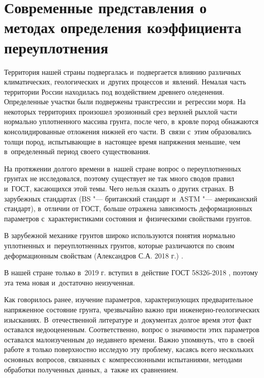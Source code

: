 \chapter{Современные представления о методах определения коэффициента переуплотнения}

Территория нашей страны подвергалась и~подвергается влиянию различных климатических, геологических и~других процессов и~явлений.
Немалая часть территории России находилась под воздействием древнего оледенения.
Определенные участки были подвержены трансгрессии и~регрессии моря.
На некоторых территориях произошел эрозионный срез верхней рыхлой части нормально уплотненного массива грунта, после чего, в~кровле пород обнажаются консолидированные отложения нижней его части.
В~связи с~этим образовались толщи пород, испытывающие в~настоящее время напряжения меньшие, чем в~определенный период своего существования.

На протяжении долгого времени в~нашей стране вопрос о переуплотненных грунтах не исследовался, поэтому существует не так много сводов правил и~ГОСТ, касающихся этой темы.
Чего нельзя сказать о других странах. 
В зарубежных стандартах (BS "--- британский стандарт и~ASTM "--- американский стандарт), в~отличии от ГОСТ, больше отражена зависимость деформационных параметров с~характеристиками состояния и~физическими свойствами грунтов.


В зарубежной механике грунтов широко используются понятия нормально уплотненных и~переуплотненных грунтов, которые различаются по своим деформационным свойствам (Александров С.А. 2018 г.) \cite{aleksandrov2018}.

В нашей стране только в~2019 г. вступил в~действие ГОСТ 58326-2018 \cite{gost58236}, поэтому эта тема новая и~достаточно неизученная.

Как говорилось ранее, изучение параметров, характеризующих предварительное напряженное состояние грунта, чрезвычайно важно при инженерно-геологических изысканиях.
В~отечественной литературе и~документах долгое время этот факт оставался недооцененным. Соответственно, вопрос о значимости этих параметров оставался малоизученным до недавнего времени.
Важно упомянуть, что в~своей работе я только поверхностно исследую эту проблему,  касаясь всего нескольких основных вопросов, связанных с~компрессионными испытаниями, методами обработки полученных данных, а~также их сравнением.

